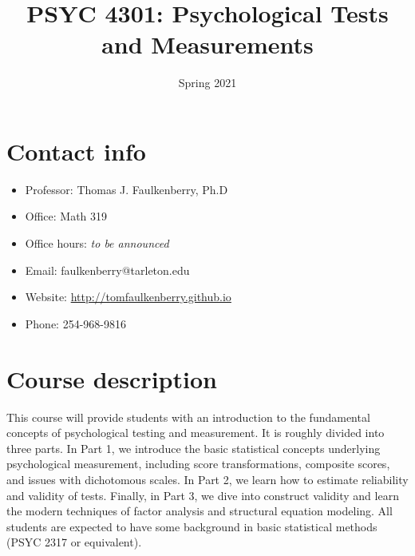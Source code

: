 \documentclass[10pt]{article}
\date{Spring 2021}
\title{PSYC 4301: Psychological Tests and Measurements}
\begin{document}
\maketitle

\section*{Contact info}
\label{sec:org74def9e}
\begin{itemize}
\item Professor: Thomas J. Faulkenberry, Ph.D
\item Office: Math 319
\item Office hours: \emph{to be announced}
\item Email: faulkenberry@tarleton.edu
\item Website: \url{http://tomfaulkenberry.github.io}
\item Phone: 254-968-9816
\end{itemize}

\section*{Course description}
\label{sec:orgf9d7dbb}

This course will provide students with an introduction to the fundamental concepts of psychological testing and measurement. It is roughly divided into three parts. In Part 1, we introduce the basic statistical concepts underlying psychological measurement, including score transformations, composite scores, and issues with dichotomous scales. In Part 2, we learn how to estimate reliability and validity of tests. Finally, in Part 3, we dive into construct validity and learn the modern techniques of factor analysis and structural equation modeling. All students are expected to have some background in basic statistical methods (PSYC 2317 or equivalent). 
\end{document}
